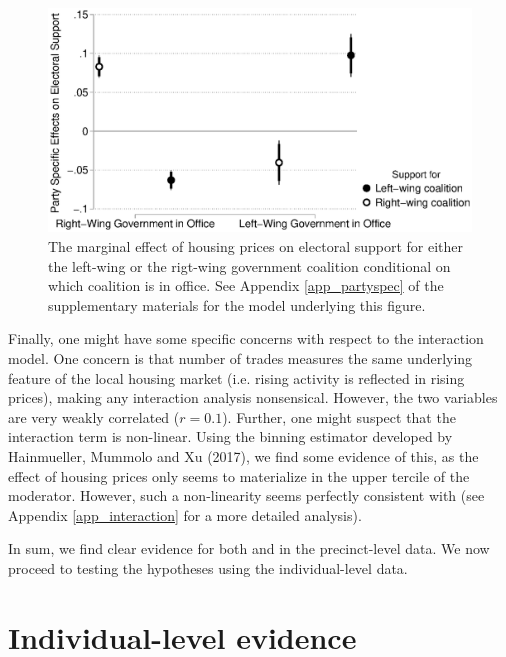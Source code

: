 \documentclass[12pt,a4paper]{article}
\begin{document}
	\begin{figure}
		\includegraphics[width=1\textwidth]{../figures/partyspecific.eps}
		\caption{The marginal effect of housing prices on electoral support for either the left-wing or the rigt-wing government coalition conditional on which coalition is in office. See Appendix \ref{app_partyspec} of the supplementary materials for the model underlying this figure.}
		\label {partyspecific}
	\end{figure}
	
	Finally, one might have some specific concerns with respect to the interaction model. One concern is that number of trades measures the same underlying feature of the local housing market (i.e. rising activity is reflected in rising prices), making any interaction analysis nonsensical. However, the two variables are very weakly correlated ($r=0.1$). Further, one might suspect that the interaction term is non-linear. Using the binning estimator developed  by Hainmueller, Mummolo and Xu (2017), we find some evidence of this, as the effect of housing prices only seems to materialize in the upper tercile of the moderator. However, such a non-linearity seems perfectly consistent with \htwo  (see Appendix \ref{app_interaction} for a more detailed analysis). 
	
	In sum, we find clear evidence for both \hone and \htwo in the precinct-level data. We now proceed to testing the hypotheses using the individual-level data.
	
	\section{Individual-level evidence}
	
\end{document}

